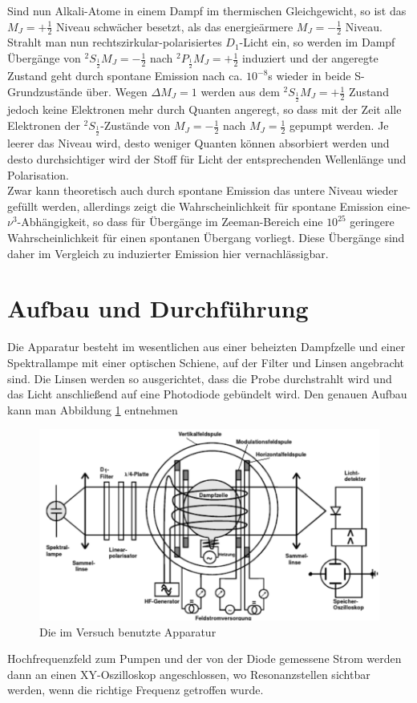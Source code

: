 Sind nun Alkali-Atome in einem Dampf im thermischen Gleichgewicht, so ist das $M_J=+\frac{1}{2}$ Niveau schwächer besetzt, als das energieärmere  $M_J=-\frac{1}{2}$ Niveau.
Strahlt man nun rechtszirkular-polarisiertes $D_1$-Licht ein, so werden im Dampf Übergänge von $^2S_{\frac{1}{2}}M_J=-\frac{1}{2}$ nach $^2P_{\frac{1}{2}}M_J=+\frac{1}{2}$ induziert und der angeregte Zustand geht durch spontane Emission nach ca. $10^{-8}$s wieder in beide S-Grundzustände über.
Wegen $\Delta M_J=1$ werden aus dem $^2S_{\frac{1}{2}}M_J=+\frac{1}{2}$ Zustand jedoch keine Elektronen mehr durch Quanten angeregt, so dass mit der Zeit alle Elektronen der $^2S_{\frac{1}{2}}$-Zustände von $M_J=-\frac{1}{2}$ nach $M_J=\frac{1}{2}$ gepumpt werden.
Je leerer das Niveau wird, desto weniger Quanten können absorbiert werden und desto durchsichtiger wird der Stoff für Licht der entsprechenden Wellenlänge und Polarisation.\\

Zwar kann theoretisch auch durch spontane Emission das untere Niveau wieder gefüllt werden, allerdings zeigt die Wahrscheinlichkeit für spontane Emission eine-$\nu^3$-Abhängigkeit, so dass für Übergänge im Zeeman-Bereich eine $10^{25}$ geringere Wahrscheinlichkeit für einen spontanen Übergang vorliegt. Diese Übergänge sind daher im Vergleich zu induzierter Emission hier vernachlässigbar.

\section{Aufbau und Durchführung}
\label{sec_durch}
Die Apparatur besteht im wesentlichen aus einer beheizten Dampfzelle und einer Spektrallampe mit einer optischen Schiene, auf der Filter und Linsen angebracht sind. Die Linsen werden so ausgerichtet, dass die Probe durchstrahlt wird und das Licht anschließend auf eine Photodiode gebündelt wird. Den genauen Aufbau kann man Abbildung \ref{pic_aufbau} entnehmen
\begin{figure}[h]
\includegraphics[scale=1]{../pics/aufbau.pdf}
\caption{Die im Versuch benutzte Apparatur}
\label{pic_aufbau}
\end{figure}
Hochfrequenzfeld zum Pumpen und der von der Diode gemessene Strom werden dann an einen XY-Oszilloskop angeschlossen, wo Resonanzstellen sichtbar werden, wenn die richtige Frequenz getroffen wurde.\\

